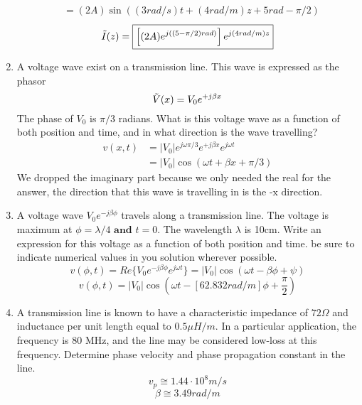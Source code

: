 \documentclass{article}
\begin{document}
\begin{enumerate}
\begin{align}
       &= (2A)\sin((3rad/s)t + (4rad/m)z+5rad - \pi / 2)
   \end{align}
   \begin{equation}
       \Tilde{I}(z) = \boxed{\left[(2A)e^{j((5-\pi/2)rad)}\right]e^{j(4rad/m)z}}
   \end{equation}
   \item A voltage wave exist on a transmission line. This wave is expressed as the phasor 
   \begin{equation}
       \Tilde{V}(x) = V_0e^{+j\beta x}
   \end{equation}
   The phase of $V_0$ is $\pi/3$ radians. What is this voltage wave as a function of both position and time, and in what direction is the wave travelling?
   \begin{align}
       v(x,t) &= |V_0|e^{j\omega\pi/3}e^{+j\beta x}e^{j\omega t}\\
       &= \boxed{|V_0|\cos(\omega t+\beta x +\pi/3)}
   \end{align}
   We dropped the imaginary part because we only needed the real for the answer, the direction that this wave is travelling in is the $\boxed{\text{-x direction}}$.
   \item A voltage wave $V_0e^{-j\beta\phi}$ travels along a transmission line. The voltage is maximum at $\phi = \lambda /4\textbf{ and } t = 0.$ The wavelength $\lambda$ is 10cm. Write an expression for this voltage as a function of both position and time. be sure to indicate numerical values in you solution wherever possible.
   \begin{equation}
       v(\phi,t) = Re\{V_0e^{-j\beta\phi}e^{j\omega t}\} = |V_0|\cos(\omega t- \beta\phi + \psi)
   \end{equation}
   \begin{equation}
       v(\phi,t) = \boxed{|V_0|\cos(\omega t- [62.832 rad/m]\phi + \frac{\pi}{2})}
   \end{equation}
   \newpage
   \item A transmission line is known to have a characteristic impedance of $72 \Omega$ and inductance per unit length equal to $0.5 \mu H/m$. In a particular application, the frequency is 80 MHz, and the line may be considered low-loss at this frequency. Determine phase velocity and phase propagation constant in the line.
   \begin{equation}
       v_p \cong \boxed{1.44\cdot 10^8 m/s}
   \end{equation}
   \begin{equation}
       \beta \cong \boxed{3.49 rad/m}

\end{equation}
\end{enumerate}
\end{document}
